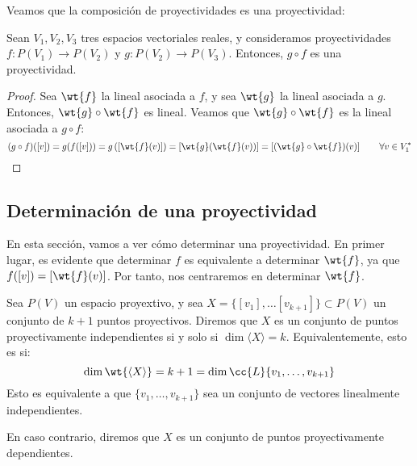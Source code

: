 Veamos que la composición de proyectividades es una proyectividad:
\begin{prop}
    Sean $V_1,V_2,V_3$ tres espacios vectoriales reales, y consideramos proyectividades
    $f:P(V_1)\to P(V_2)$ y $g:P(V_2)\to P(V_3)$. Entonces, $g\circ f$ es una proyectividad.
\end{prop}
\begin{proof}
    Sea $\wt{f}$ la lineal asociada a $f$, y sea $\wt{g}$ la lineal asociada a $g$.
    Entonces, $\wt{g}\circ \wt{f}$ es lineal. Veamos que $\wt{g}\circ \wt{f}$ es la
    lineal asociada a $g\circ f$:
    \begin{equation*}
        (g\circ f)([v]) = g(f([v])) = g\left(\left[\wt{f}(v)\right]\right)
        = \left[\wt{g}(\wt{f}(v))\right] = \left[(\wt{g}\circ \wt{f})(v)\right] \qquad \forall v\in V_1^\ast
    \end{equation*}
\end{proof}

\subsection{Determinación de una proyectividad}

En esta sección, vamos a ver cómo determinar una proyectividad.
En primer lugar, es evidente que determinar $f$ es equivalente a determinar $\wt{f}$, ya que $f([v])=\left[\wt{f}(v)\right]$. Por tanto, nos centraremos en determinar $\wt{f}$.

\begin{definicion}
    Sea $P(V)$ un espacio proyextivo, y sea $X=\{[v_1],\dots [v_{k+1}]\}\subset P(V)$ un conjunto de $k+1$ puntos proyectivos.
    Diremos que $X$ es un conjunto de puntos proyectivamente independientes si y solo si $\dim \langle X \rangle = k$. Equivalentemente, esto es si:
    \begin{equation*}
        \dim \wt{\langle X \rangle} = k +1 = \dim \cc{L}\{v_1,\dots,v_{k+1}\}
    \end{equation*}
    Esto es equivalente a que $\{v_1,\dots,v_{k+1}\}$ sea un conjunto de vectores linealmente independientes.

    En caso contrario, diremos que $X$ es un conjunto de puntos proyectivamente dependientes.    
\end{definicion}

